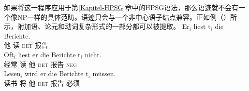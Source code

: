 如果将这一程序应用于第\ref{Kapitel-HPSG}章中的HPSG\indexhpsgc 语法，那么语迹就不会有一个像NP一样的具体范畴。语迹只会与一个非中心语子结点兼容。正如例（）所示，附加语、论元和动词复杂形式的一部分都可以被提取。
\eal
\ex 
\gll Er$_i$ liest t$_i$ die Berichte.\\
	 他 读 {}    \textsc{det} 报告\\
\ex 
\gll Oft$_i$ liest er die Berichte t$_i$ nicht.\\
	 经常 读 他 \textsc{det} 报告 {} \textsc{neg}\\
\ex 
\gll Lesen$_i$ wird er die Berichte t$_i$ müssen.\\
	 读书 将 他 \textsc{det} 报告 {} 必须\\
\zl

